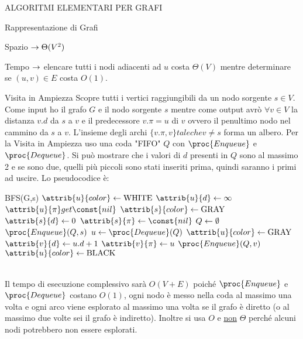 \documentclass[8pt]{extarticle}
\begin{document}
\begin{formulario}
\begin{myParagraph}{ALGORITMI ELEMENTARI PER GRAFI}
\begin{subParagraph}{Rappresentazione di Grafi}
\begin{Descr}
				\begin{Descr} 
					\item[Spazio] $\rightarrow \Theta(V^2)$
					\item[Tempo] $\rightarrow$ elencare tutti i nodi adiacenti ad $u$ costa $\Theta(V)$ mentre determinare se $(u,v)\in E$ costa $O(1)$.
				\end{Descr}
			\end{Descr}
		\end{subParagraph}
		\begin{subParagraph}{Visita in Ampiezza}
Scopre tutti i vertici raggiungibili da un nodo sorgente $s\in V$. Come input ho il grafo $G$ e il nodo sorgente $s$ mentre come output avrò $\forall v\in V$ la distanza $v.d$ da $s$ a $v$ e il predecessore $v.\pi=u$ di $v$ ovvero il penultimo nodo nel cammino da $s$ a $v$. L'insieme degli archi $\{v.\pi,v\} tale che v\neq s$ forma un albero. Per la Visita in Ampiezza uso una coda "FIFO" $Q$ con $\proc{Enqueue}$ e $\proc{Dequeue}$. Si può mostrare che i valori di $d$ presenti in $Q$ sono al massimo 2 e se sono due, quelli più piccoli sono stati inseriti prima, quindi saranno i primi ad uscire. Lo pseudocodice è:
			\begin{code}{BFS(G,s)}
\li {} 
	\li $\attrib{u}{color}\get\text{WHITE}$
	\li $\attrib{u}{d}\get\infty$
	\li $\attrib{u}{\pi}get\const{nil}$
\END
\li $\attrib{s}{color}\get\text{GRAY}$ 
\li $\attrib{s}{d}\get0$
\li $\attrib{s}{\pi}\get\const{nil}$
\li $Q\leftarrow\emptyset$ 
\li $\proc{Enqueue}(Q,s)$ 
\li {}
	\li $u\get\proc{Dequeue}(Q)$ 
	\li {} 
		\li {} 
			\li $\attrib{u}{color}\get\text{GRAY}$
			\li $\attrib{v}{d}\get u.d+1$
			\li $\attrib{v}{\pi}\get u$
			\li $\proc{Enqueue}(Q,v)$
		\END
	\END
	\li $\attrib{u}{color}\get \text{BLACK}$ 
\END
			\end{code}
\\
Il tempo di esecuzione complessivo sarà $O(V+E)$ poiché $\proc{Enqueue}$ e $\proc{Dequeue}$ costano $O(1)$, ogni nodo è messo nella coda al massimo una volta e ogni arco viene esplorato al massimo una volta se il grafo è diretto (o al massimo due volte sei il grafo è indiretto). Inoltre si usa $O$ e \underline{non} $\Theta$ perché alcuni nodi potrebbero non essere esplorati.

\end{subParagraph}
\end{myParagraph}
\end{formulario}
\end{document}
